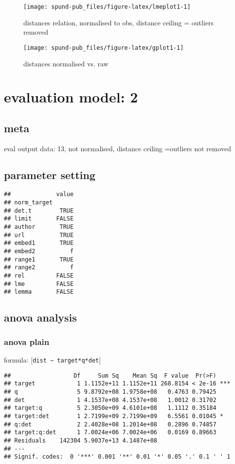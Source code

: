 \documentclass[
  12pt,
  oneside]{book}
\begin{document}
\begin{figure}[H]
\texttt{[image: spund-pub\_files/figure-latex/lmeplot1-1]} \caption{distances relation, normalised to obs, distance ceiling =  outliers removed}\label{fig:lmeplot1}
\end{figure}

\begin{figure}[H]
\texttt{[image: spund-pub\_files/figure-latex/gplot1-1]} \caption{distances normalised vs. raw}\label{fig:gplot1}
\end{figure}

\section{evaluation model: 2}\label{evaluation-model-2}

\subsection{meta}\label{meta-1}

eval output data: 13, not normalised, distance ceiling =outliers not removed

\subsection{parameter setting}\label{parameter-setting-1}

\begin{verbatim}
##             value
## norm_target      
## det.t        TRUE
## limit       FALSE
## author       TRUE
## url          TRUE
## embed1       TRUE
## embed2          f
## range1       TRUE
## range2          f
## rel         FALSE
## lme         FALSE
## lemma       FALSE
\end{verbatim}

\subsection{anova analysis}\label{anova-analysis-1}

\subsubsection{anova plain}\label{anova-plain-1}

formula: {[}\texttt{dist\ \textasciitilde{}\ target*q*det}{]}

\begin{verbatim}
##                  Df     Sum Sq    Mean Sq  F value  Pr(>F)    
## target            1 1.1152e+11 1.1152e+11 268.8154 < 2e-16 ***
## q                 5 9.8792e+08 1.9758e+08   0.4763 0.79425    
## det               1 4.1537e+08 4.1537e+08   1.0012 0.31702    
## target:q          5 2.3050e+09 4.6101e+08   1.1112 0.35184    
## target:det        1 2.7199e+09 2.7199e+09   6.5561 0.01045 *  
## q:det             2 2.4028e+08 1.2014e+08   0.2896 0.74857    
## target:q:det      1 7.0024e+06 7.0024e+06   0.0169 0.89663    
## Residuals    142304 5.9037e+13 4.1487e+08                     
## ---
## Signif. codes:  0 '***' 0.001 '**' 0.01 '*' 0.05 '.' 0.1 ' ' 1
\end{verbatim}
\end{document}
